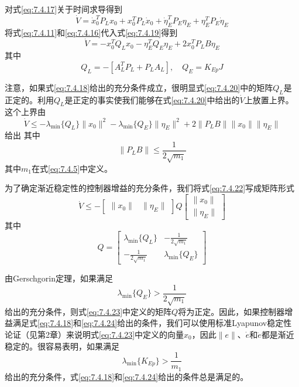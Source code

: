 \documentclass[UTF8]{ctexart}
\begin{document}
对式\eqref{eq:7.4.17}关于时间求导得到
\begin{equation}\label{eq:7.4.19}
\dot{V} = \dot{x}_0^T P_L x_0 + x_0^T P_L \dot{x}_0 + \dot{\eta}_E^T P_E \eta_E + \eta_E^T P_E \dot{\eta}_E
\end{equation}
将式\eqref{eq:7.4.11}和\eqref{eq:7.4.16}代入式\eqref{eq:7.4.19}得到
\begin{equation}\label{eq:7.4.20}
\dot{V} = -x_0^T Q_L x_0 - \eta_E^T Q_E \eta_E + 2x_0^T P_L B \eta_E
\end{equation}
其中
\begin{equation*}
Q_L = -[A_L^T P_L + P_L A_L], \quad Q_E = K_{Ep}J
\end{equation*}

注意，如果式\eqref{eq:7.4.18}给出的充分条件成立，很明显式\eqref{eq:7.4.20}中的矩阵$Q_L$是正定的。利用$Q_L$是正定的事实使我们能够在式\eqref{eq:7.4.20}中给出的$\dot{V}$上放置上界。这个上界由
\begin{equation}\label{eq:7.4.22}
\dot{V} \leq -\lambda_{\min}\{Q_L\}\|x_0\|^2 - \lambda_{\min}\{Q_E\}\|\eta_E\|^2 + 2\|P_L B\|\|x_0\|\|\eta_E\|
\end{equation}
给出
其中
\begin{equation*}
\|P_L B\| \leq \frac{1}{2\sqrt{m_1}}
\end{equation*}
其中$m_1$在式\eqref{eq:7.4.5}中定义。

为了确定渐近稳定性的控制器增益的充分条件，我们将式\eqref{eq:7.4.22}写成矩阵形式
\begin{equation}\label{eq:7.4.23}
\dot{V} \leq -\begin{bmatrix} \|x_0\| & \|\eta_E\| \end{bmatrix} Q \begin{bmatrix} \|x_0\| \\ \|\eta_E\| \end{bmatrix}
\end{equation}
其中
\begin{equation*}
Q = \begin{bmatrix} \lambda_{\min}\{Q_L\} & -\frac{1}{2\sqrt{m_1}} \\ -\frac{1}{2\sqrt{m_1}} & \lambda_{\min}\{Q_E\} \end{bmatrix}
\end{equation*}

由Gerschgorin定理，如果满足
\begin{equation}\label{eq:7.4.24}
\lambda_{\min}\{Q_E\} > \frac{1}{2\sqrt{m_1}}
\end{equation}
给出的充分条件，则式\eqref{eq:7.4.23}中定义的矩阵$Q$将为正定。因此，如果控制器增益满足式\eqref{eq:7.4.18}和\eqref{eq:7.4.24}给出的条件，我们可以使用标准Lyapunov稳定性论证（见第2章）来说明式\eqref{eq:7.4.23}中定义的向量$x_0$，因此$\|e\|$、$\dot{e}$和$\ddot{e}$都是渐近稳定的。很容易表明，如果满足
\begin{equation}\label{eq:7.4.25}
\lambda_{\min}\{K_{Ep}\} > \frac{1}{m_1}
\end{equation}
给出的充分条件，式\eqref{eq:7.4.18}和\eqref{eq:7.4.24}给出的条件总是满足的。
\end{document}
